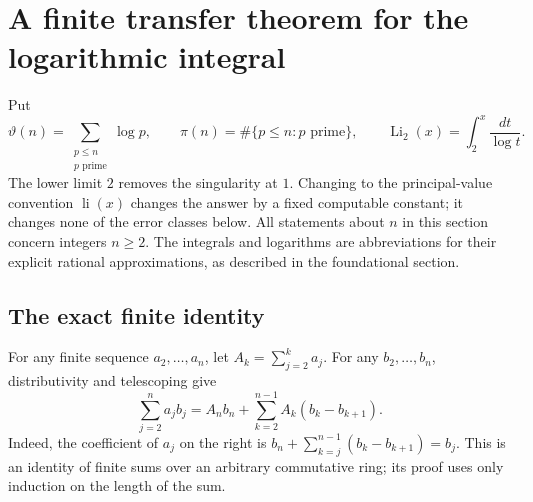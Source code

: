 
\section{A finite transfer theorem for the logarithmic integral}
\label{sec:finite-transfer}

Put
\[
 \vartheta(n)=\sum_{\substack{p\le n\\p\text{ prime}}}\log p,
 \qquad \pi(n)=\#\{p\le n:p\text{ prime}\},
 \qquad \operatorname{Li}_2(x)=\int_2^x\frac{dt}{\log t}.
\]
The lower limit $2$ removes the singularity at $1$.  Changing to the
principal-value convention $\operatorname{li}(x)$ changes the answer by a
fixed computable constant; it changes none of the error classes below.
All statements about $n$ in this section concern integers $n\ge2$.
The integrals and logarithms are abbreviations for their explicit rational
approximations, as described in the foundational section.

\subsection{The exact finite identity}

For any finite sequence $a_2,\ldots,a_n$, let
$A_k=\sum_{j=2}^k a_j$.  For any $b_2,\ldots,b_n$, distributivity and
telescoping give
\begin{equation}\label{eq:finite-abel}
 \sum_{j=2}^n a_jb_j
   =A_nb_n+\sum_{k=2}^{n-1}A_k(b_k-b_{k+1}).
\end{equation}
Indeed, the coefficient of $a_j$ on the right is
$b_n+\sum_{k=j}^{n-1}(b_k-b_{k+1})=b_j$.
This is an identity of finite sums over an arbitrary commutative ring;
its proof uses only induction on the length of the sum.

